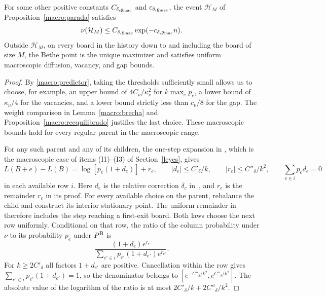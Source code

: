\begin{corolario}\label{macro:cambio}
For some other positive constants $C_{\delta,\varrho_{\rm mac}}$ and $c_{\delta,\varrho_{\rm mac}}$,
the event $\mathcal H_M$ of Proposition~\ref{macro:parada} satisfies
\[
 \nu(\mathcal H_M)\le C_{\delta,\varrho_{\rm mac}}\exp(-c_{\delta,\varrho_{\rm mac}}n).
\]
Outside $\mathcal H_M$, on every board in the history down to and including the board of size $M$,
the Bethe point is the unique maximizer and satisfies uniform macroscopic diffusion, vacancy, and gap
bounds.
\end{corolario}
\begin{proof}
By \eqref{macro:predictor}, taking the thresholds sufficiently small allows us to choose, for
example, an upper bound of $4C_\nu/\kappa_\nu^2$ for $k\max_e p_e$, a lower bound of $\kappa_\nu/4$
for the vacancies, and a lower bound strictly less than $c_\nu/8$ for the gap. The weight comparison
in Lemma~\ref{macro:brecha} and Proposition~\ref{macro:reequilibrado} justifies the last choice.
These macroscopic bounds hold for every regular parent in the macroscopic range.

For any such parent and any of its children, the one-step expansion in
\cite[Theorem~7.1 and Corollary~7.2, with their proofs]{pred}, which is the macroscopic case of items
(I1)--(I3) of Section~\ref{leyes}, gives
\[
 L(B+e)-L(B)=\log[p_e(1+d_e)]+r_e,\qquad
 |d_e|\le C'_\delta/k,\qquad |r_e|\le C''_\delta/k^2,\qquad
 \sum_{e\in i}p_ed_e=0
\]
in each available row $i$. Here $d_e$ is the relative correction $\delta_c$
in~\cite[Theorem~7.1]{pred}, and $r_e$ is the remainder $r_c$ in its proof. For every available
choice on the parent, \cite[Sections~6.5 and~7.2]{pred} rebalance the child and construct its
interior stationary point. The uniform remainder in \cite[Section~7.8]{pred} therefore includes
the step reaching a first-exit board. Both laws choose the next row uniformly. Conditional on that
row, the ratio of the column probability under $\nu$ to its probability $p_e$ under $P^{\rm B}$ is
\[
 \frac{(1+d_e)e^{r_e}}{\sum_{e'\in i}p_{e'}(1+d_{e'})e^{r_{e'}}} .
\]
For $k\ge2C'_\delta$ all factors $1+d_{e'}$ are positive. Cancellation within the row gives
$\sum_{e'\in i}p_{e'}(1+d_{e'})=1$, so the denominator belongs to
$[e^{-C''_\delta/k^2},e^{C''_\delta/k^2}]$. The absolute value of the logarithm of the ratio is at
most $2C'_\delta/k+2C''_\delta/k^2$.


\end{proof}
